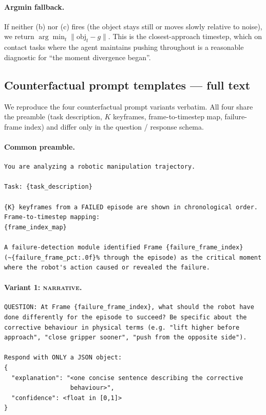 \paragraph{Argmin fallback.}
If neither (b) nor (c) fires (the object stays still or moves slowly
relative to noise), we return $\arg\min_t \|\text{obj}_t - g\|$. This is
the closest-approach timestep, which on contact tasks where the agent
maintains pushing throughout is a reasonable diagnostic for ``the moment
divergence began''.

\subsection{Counterfactual prompt templates --- full text}
\label{app:cf-prompts}

We reproduce the four counterfactual prompt variants verbatim. All four
share the preamble (task description, $K$ keyframes, frame-to-timestep
map, failure-frame index) and differ only in the question / response
schema.

\paragraph{Common preamble.}
{\small
\begin{verbatim}
You are analyzing a robotic manipulation trajectory.

Task: {task_description}

{K} keyframes from a FAILED episode are shown in chronological order.
Frame-to-timestep mapping:
{frame_index_map}

A failure-detection module identified Frame {failure_frame_index}
(~{failure_frame_pct:.0f}% through the episode) as the critical moment
where the robot's action caused or revealed the failure.
\end{verbatim}}

\paragraph{Variant 1: \textsc{narrative}.}
{\small
\begin{verbatim}
QUESTION: At Frame {failure_frame_index}, what should the robot have
done differently for the episode to succeed? Be specific about the
corrective behaviour in physical terms (e.g. "lift higher before
approach", "close gripper sooner", "push from the opposite side").

Respond with ONLY a JSON object:
{
  "explanation": "<one concise sentence describing the corrective
                  behaviour>",
  "confidence": <float in [0,1]>
}
\end{verbatim}}

